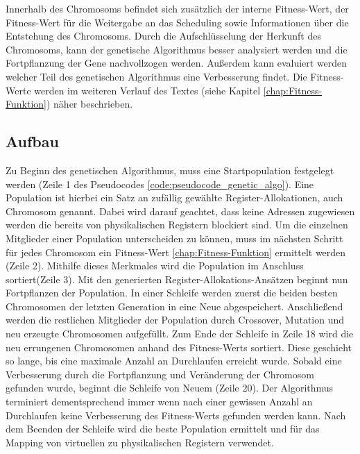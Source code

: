Innerhalb des Chromosoms befindet sich zusätzlich der interne Fitness-Wert, der Fitness-Wert für die Weitergabe an das Scheduling sowie Informationen über die Entstehung des Chromosoms. Durch die Aufschlüsselung der Herkunft des Chromosoms, kann der genetische Algorithmus besser analysiert werden und die Fortpflanzung der Gene nachvollzogen werden. Außerdem kann evaluiert werden welcher Teil des genetischen Algorithmus eine Verbesserung findet. Die Fitness-Werte werden im weiteren Verlauf des Textes (siehe Kapitel \ref{chap:Fitness-Funktion}) näher beschrieben.
 
 
\subsection{Aufbau}
\label{chap:aufbau}
Zu Beginn des genetischen Algorithmus, muss eine Startpopulation festgelegt werden (Zeile 1 des Pseudocodes \ref{code:pseudocode_genetic_algo}). Eine Population ist hierbei ein Satz an zufällig gewählte Register-Allokationen, auch Chromosom genannt. Dabei wird darauf geachtet, dass keine Adressen zugewiesen werden die bereits von physikalischen Registern blockiert sind.
Um die einzelnen Mitglieder einer Population unterscheiden zu können, muss im nächsten Schritt für jedes Chromosom ein Fitness-Wert \ref{chap:Fitness-Funktion} ermittelt werden (Zeile 2). Mithilfe dieses Merkmales wird die Population im Anschluss sortiert(Zeile 3). 
Mit den generierten Register-Allokations-Ansätzen beginnt nun Fortpflanzen der Population. In einer Schleife werden zuerst die beiden besten Chromosomen der letzten Generation in eine Neue abgespeichert. Anschließend werden die restlichen Mitglieder der Population durch Crossover, Mutation und neu erzeugte Chromosomen aufgefüllt. Zum Ende der Schleife in Zeile 18 wird die neu errungenen Chromosomen anhand des Fitness-Werts sortiert. Diese geschieht so lange, bis eine maximale Anzahl an Durchlaufen erreicht wurde. Sobald eine Verbesserung durch die Fortpflanzung und Veränderung der Chromosom gefunden wurde, beginnt die Schleife von Neuem (Zeile 20). Der Algorithmus terminiert dementsprechend immer wenn nach einer gewissen Anzahl an Durchlaufen keine Verbesserung des Fitness-Werts gefunden werden kann. Nach dem Beenden der Schleife wird die beste Population ermittelt und für das Mapping von virtuellen zu physikalischen Registern verwendet.

